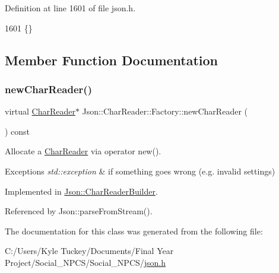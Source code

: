Definition at line 1601 of file json.\+h.


\begin{DoxyCode}
1601 \{\}
\end{DoxyCode}


\subsection{Member Function Documentation}
\mbox{\label{class_json_1_1_char_reader_1_1_factory_a4c5862a1ffd432372dbe65cf59de98c4}} 
\subsubsection{\texorpdfstring{new\+Char\+Reader()}{newCharReader()}}
{\footnotesize\ttfamily virtual \hyperlink{class_json_1_1_char_reader}{Char\+Reader}$\ast$ Json\+::\+Char\+Reader\+::\+Factory\+::new\+Char\+Reader (\begin{DoxyParamCaption}{ }\end{DoxyParamCaption}) const\hspace{0.3cm}{\ttfamily [pure virtual]}}



Allocate a \hyperlink{class_json_1_1_char_reader}{Char\+Reader} via operator new(). 


\begin{DoxyExceptions}{Exceptions}
{\em std\+::exception} & if something goes wrong (e.\+g. invalid settings) \\
\hline
\end{DoxyExceptions}


Implemented in \hyperlink{class_json_1_1_char_reader_builder_a3a262fcc76c1eb8eebfd4718fb4e9722}{Json\+::\+Char\+Reader\+Builder}.



Referenced by Json\+::parse\+From\+Stream().



The documentation for this class was generated from the following file\+:\begin{DoxyCompactItemize}
\item 
C\+:/\+Users/\+Kyle Tuckey/\+Documents/\+Final Year Project/\+Social\+\_\+\+N\+P\+C\+S/\+Social\+\_\+\+N\+P\+C\+S/\hyperlink{json_8h}{json.\+h}\end{DoxyCompactItemize}
